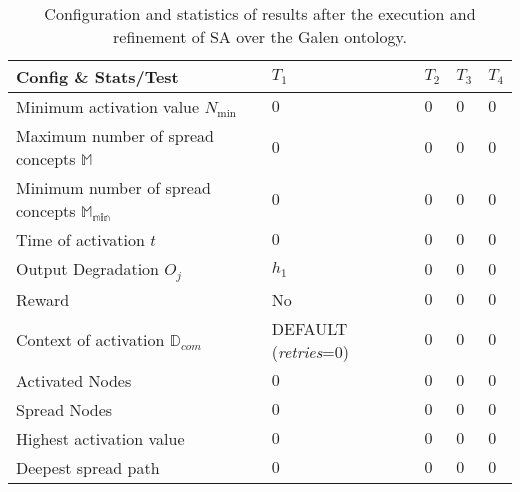 \begin{table}[htb]
\renewcommand{\arraystretch}{1.3}
\begin{center}
\begin{tabular}{|p{4cm}|p{2cm}|p{2cm}|p{2cm}|p{2cm}|}
\hline
        Config \& Stats/Test&$T_1$&$T_2$&$T_3$&$T_4$\\ \hline
        \hline
        Minimum activation value $N_{\min}$ &$0$ &$0$ &$0$ &$0$ \\ \hline
	Maximum number of spread concepts $\mathbb{M}$&$0$ &$0$ &$0$ &$0$\\ \hline
	Minimum number of spread concepts $\mathbb{M_{\min}}$&$0$ &$0$ &$0$ &$0$  \\ \hline
	Time of activation $t$&$0$ &$0$ &$0$ &$0$ \\ \hline
	Output Degradation $O_j$ & $h_1$ &$0$ &$0$ &$0$\\ \hline
	Reward &No &$0$ &$0$ &$0$\\ \hline
	\hline
	Context of activation $\mathbb{D}_{com}$&DEFAULT (\textit{retries}=0) &$0$ &$0$ &$0$\\ \hline
	Activated Nodes &$0$ &$0$ &$0$ &$0$ \\ \hline
	Spread Nodes &$0$ &$0$ &$0$ &$0$ \\ \hline
	Highest activation value &$0$ &$0$ &$0$ &$0$\\ \hline
	Deepest spread path &$0$ &$0$ &$0$ &$0$ \\ \hline
\hline
\end{tabular}
  \caption{Configuration and statistics of results after the execution and refinement of SA over the Galen ontology.}
  \label{tabla:test-restricciones}
  \end{center}
\end{table} 

